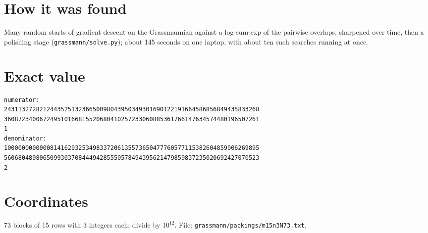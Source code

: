 \documentclass[11pt,a4paper]{article}
\begin{document}
\section{How it was found}
Many random starts of gradient descent on the Grassmannian against a log-sum-exp of the pairwise overlaps, sharpened over time, then a polishing stage (\texttt{grassmann/solve.py}); about 145 seconds on one laptop, with about ten such searches running at once.


\appendix
\section{Exact value}
{\small
\begin{verbatim}
numerator:
243113272821244352513236650098043950349301690122191664586856849435833268
360872340067249510166815520680410257233060885361766147634574480196507261
1
denominator:
100000000000081416293253498337206135573650477760577115382604859006269895
560680489806509930370844494285550578494395621479859837235020692427070523
2
\end{verbatim}}

\section{Coordinates}
73 blocks of 15 rows with 3 integers each; divide by $10^{12}$. File: \texttt{grassmann/packings/m15n3N73.txt}.
{\tiny
\begin{multicols}{3}
\end{multicols}}
\end{document}

